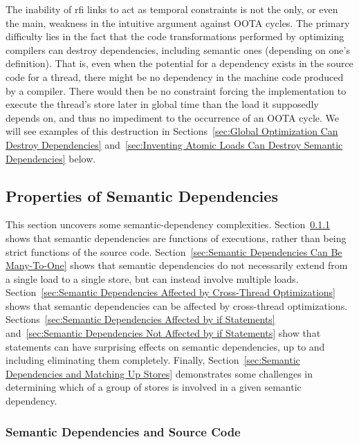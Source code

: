 \documentclass[10]{article}
\begin{document}
The inability of rfi links to act as temporal constraints is not the
only, or even the main, weakness in the intuitive argument against
OOTA cycles.
The primary difficulty lies in the fact that the code transformations
performed by optimizing compilers can destroy dependencies, including
semantic ones (depending on one's definition).
That is, even when the potential for a dependency exists in the
source code for a thread, there might be no dependency in the machine
code produced by a compiler.
There would then be no constraint forcing the implementation to execute
the thread's store later in global time than the load it supposedly depends on,
and thus no impediment to the occurrence of an OOTA cycle.
We will see examples of this destruction in
Sections~\ref{sec:Global Optimization Can Destroy Dependencies}
and~\ref{sec:Inventing Atomic Loads Can Destroy Semantic Dependencies} below.

\subsection{Properties of Semantic Dependencies}
\label{sec:Properties of Semantic Dependencies}

This section uncovers some semantic-dependency complexities.
Section~\ref{sec:Semantic Dependencies and Source Code}
shows that semantic dependencies are functions of executions,
rather than being strict functions of the source code.
Section~\ref{sec:Semantic Dependencies Can Be Many-To-One}
shows that semantic dependencies do not necessarily extend
from a single load to a single store, but can instead involve
multiple loads.
Section~\ref{sec:Semantic Dependencies Affected by Cross-Thread Optimizations}
shows that semantic dependencies can be affected by cross-thread
optimizations.
Sections~\ref{sec:Semantic Dependencies Affected by if Statements}
and~\ref{sec:Semantic Dependencies Not Affected by if Statements}
show that  statements can have surprising effects on semantic
dependencies, up to and including eliminating them completely.
Finally,
Section~\ref{sec:Semantic Dependencies and Matching Up Stores}
demonstrates some challenges in determining which of a group of
stores is involved in a given semantic dependency.

\subsubsection{Semantic Dependencies and Source Code}
\label{sec:Semantic Dependencies and Source Code}
\end{document}
